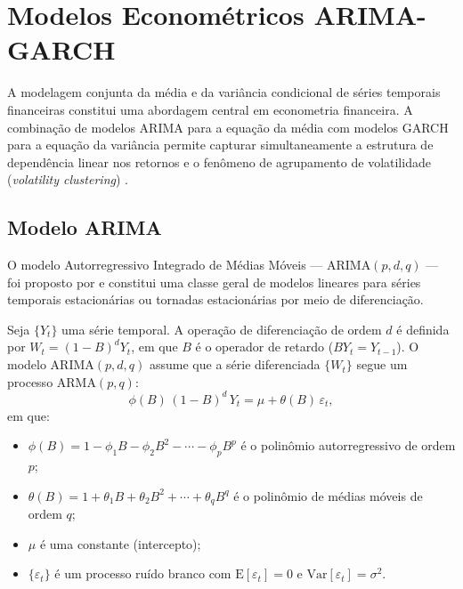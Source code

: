 \section{Modelos Econométricos ARIMA-GARCH}
\label{sec:arima_garch}

A modelagem conjunta da média e da variância condicional de séries temporais
financeiras constitui uma abordagem central em econometria financeira. A
combinação de modelos ARIMA para a equação da média com modelos GARCH para a
equação da variância permite capturar simultaneamente a estrutura de
dependência linear nos retornos e o fenômeno de agrupamento de volatilidade
(\emph{volatility clustering}) \cite{bollerslev1986,tsay2010}.

\subsection{Modelo ARIMA}
\label{subsec:arima}

O modelo Autorregressivo Integrado de Médias Móveis --- ARIMA$(p,d,q)$ ---
foi proposto por  e constitui uma classe geral de modelos
lineares para séries temporais estacionárias ou tornadas estacionárias por
meio de diferenciação.

Seja $\{Y_t\}$ uma série temporal. A operação de diferenciação de ordem $d$
é definida por $W_t = (1-B)^d Y_t$, em que $B$ é o operador de
retardo ($BY_t = Y_{t-1}$). O modelo ARIMA$(p,d,q)$ assume que a série
diferenciada $\{W_t\}$ segue um processo ARMA$(p,q)$:
%
\begin{equation}
    \label{eq:arima}
    \phi(B)\,(1-B)^d\,Y_t = \mu + \theta(B)\,\varepsilon_t,
\end{equation}
%
em que:
\begin{itemize}
    \item $\phi(B) = 1 - \phi_1 B - \phi_2 B^2 - \cdots - \phi_p B^p$ é o
          polinômio autorregressivo de ordem $p$;
    \item $\theta(B) = 1 + \theta_1 B + \theta_2 B^2 + \cdots + \theta_q B^q$
          é o polinômio de médias móveis de ordem $q$;
    \item $\mu$ é uma constante (intercepto);
    \item $\{\varepsilon_t\}$ é um processo ruído branco com
          $\mathrm{E}[\varepsilon_t] = 0$ e
          $\mathrm{Var}[\varepsilon_t] = \sigma^2$.
\end{itemize}

